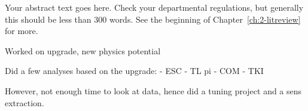 Your abstract text goes here.  Check your departmental regulations, but generally this should be less than 300 words.  See the beginning of Chapter~\ref{ch:2-litreview} for more.

Worked on upgrade, new physics potential

Did a few analyses based on the upgrade:
    - ESC
    - TL pi
    - COM
    - TKI

However, not enough time to look at data, hence did a tuning project and a sens extraction.
